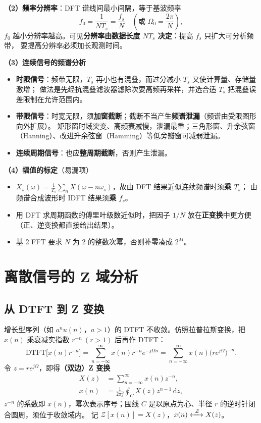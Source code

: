 \textbf{（2）频率分辨率}：DFT 谱线间最小间隔，等于基波频率
\begin{equation}
f_0=\frac{1}{NT_s}=\frac{f_s}{N}\quad\left(\text{或 }\Omega_0=\frac{2\pi}{N}\right),
\end{equation}
$f_0$ 越小分辨率越高。可见\textbf{分辨率由数据长度 $NT_s$ 决定}：提高 $f_s$ 只扩大可分析频带，
要提高分辨率必须加长观测时间。

\textbf{（3）连续信号的频谱分析}
\begin{itemize}
\item \textbf{时限信号}：频带无限，$T_s$ 再小也有混叠，而过分减小 $T_s$ 又使计算量、存储量激增；
  做法是先经抗混叠滤波器滤除次要高频再采样，并选合适 $T_s$ 把混叠误差限制在允许范围内。
\item \textbf{带限信号}：时宽无限，须\textbf{加窗截断}；截断不当产生\textbf{频谱泄漏}（频谱由受限图形向外扩展）。
  矩形窗时域突变、高频衰减慢，泄漏最重；三角形窗、升余弦窗（Hanning）、改进升余弦窗（Hamming）等低旁瓣窗可减弱泄漏。
\item \textbf{连续周期信号}：也应\textbf{整周期截断}，否则产生泄漏。
\end{itemize}

\textbf{（4）幅值的标定}（易漏项）
\begin{itemize}
\item $X_s(\omega)=\frac{1}{T_s}\sum_nX(\omega-n\omega_s)$，故由 DFT 结果近似连续频谱时须\textbf{乘 $T_s$}；
  由频谱合成波形时 IDFT 结果须\textbf{乘 $f_s$}。
\item 用 DFT 求周期函数的傅里叶级数近似时，把因子 $1/N$ 放在\textbf{正变换}中更方便（正、逆变换都直接给出结果）。
\item 基 2 FFT 要求 $N$ 为 2 的整数次幂，否则补零凑成 $2^M$。
\end{itemize}

\section{离散信号的 Z 域分析}

\subsection{从 DTFT 到 Z 变换}

增长型序列（如 $a^nu(n)$，$a>1$）的 DTFT 不收敛。仿照拉普拉斯变换，把 $x(n)$ 乘衰减实指数 $r^{-n}\ (r>1)$ 后再作 DTFT：
\begin{equation}
\mathrm{DTFT}\big[x(n)r^{-n}\big]
=\sum_{n=-\infty}^{\infty}x(n)r^{-n}e^{-j\Omega n}
=\sum_{n=-\infty}^{\infty}x(n)\big(re^{j\Omega}\big)^{-n}.
\end{equation}
令 $z=re^{j\Omega}$，即得\textbf{（双边）Z 变换}
\begin{align}
X(z)&=\sum_{n=-\infty}^{\infty}x(n)z^{-n},\\
x(n)&=\frac{1}{2\pi j}\oint_{C}X(z)z^{n-1}\,\mathrm{d}z ,
\end{align}
$z^{-n}$ 的系数即 $x(n)$，幂次表示序号；围线 $C$ 是以原点为心、半径 $r$ 的逆时针闭合圆周，须位于收敛域内。
记 $\mathcal{Z}[x(n)]=X(z)$，$x(n)\xleftrightarrow{\ \mathcal{Z}\ }X(z)$。

